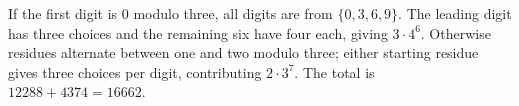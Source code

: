 If the first digit is $0$ modulo three, all digits are from $\{0,3,6,9\}$. The leading digit has three choices and the remaining six have four each, giving $3\cdot4^6$. Otherwise residues alternate between one and two modulo three; either starting residue gives three choices per digit, contributing $2\cdot3^7$. The total is $12288+4374=\boxed{16662}$.
